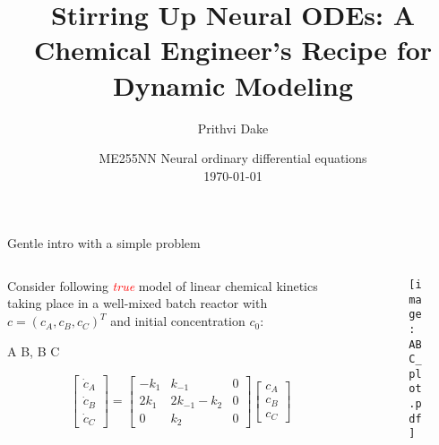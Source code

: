 \documentclass[dvipsnames, 9pt]{beamer}
\title[NODEs]{Stirring Up Neural ODEs: A Chemical Engineer's Recipe for Dynamic Modeling
}
\author[ME255NN--Dake]{Prithvi Dake}
\institute [UCSB]{Department of Chemical
Engineering\\
\pgfuseimage{ucsb-logo}}
\date{ME255NN Neural ordinary differential equations  \\
\today}
\begin{document}
\frame{\titlepage}

\begin{frame}{Gentle intro with a simple problem}
    \begin{columns}
    {\begin{column}{0.45\textwidth}
    \begin{block}{}
        Consider following \textcolor{red}{\textit{true}} model of linear chemical kinetics taking place
        in a well-mixed batch reactor with $c = (c_A, c_B, c_C)^T$ and initial concentration
        $c_0$:
        \begin{rxn*}{} 
        A  B, \qquad  B \rarrow[k_2] C
        \label{rxn:atobtoc}
        \end{rxn*}
        \begin{gather*}
        \begin{bmatrix} \dot{c}_A \\ \dot{c}_B \\ \dot{c}_C \end{bmatrix}
        =\begin{bmatrix}
            -k_{1} & k_{-1} & 0 \\
            2k_{1} & 2k_{-1} - k_2 & 0 \\
            0 & k_{2} & 0
        \end{bmatrix}
        \begin{bmatrix}  c_A \\ c_B \\ c_C \end{bmatrix} 
        \label{eq:atobtoc}
        \end{gather*}
    \end{block}
    \end{column}}
    {\begin{column}{0.5\textwidth}
    \begin{figure}[h]
        \centering
        \texttt{[image: ABC\_plot.pdf]} 
    \end{figure}
    \end{column}}
    \end{columns}
\end{frame}
\end{document}
